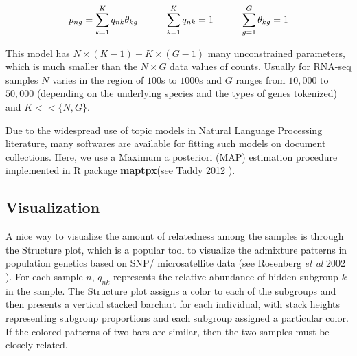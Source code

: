 $$ p_{ng} = \sum_{k=1}^{K} q_{nk}\theta_{kg}   \hspace{1 cm}  \sum_{k=1}^{K} q_{nk}=1 \hspace{1 cm} \sum_{g=1}^{G} \theta_{kg}=1 $$

This model has $N \times (K-1) + K \times (G-1)$ many unconstrained parameters, which is much smaller than the $N \times G$  data values of counts. Usually for RNA-seq samples $N$ varies in the region of $100$s to $1000$s  and $G$ ranges from $10,000$ to $50,000$ (depending on the underlying species and the types of genes tokenized) and $K << \{N,G \}$. 

Due to the widespread use of topic models in Natural Language Processing literature, many softwares are available for fitting such models on document collections. Here, we use a Maximum a posteriori (MAP)  estimation procedure implemented in R package  \textbf{maptpx}(see Taddy 2012 \cite{Taddy2012}).

%
%

\subsection{Visualization}

A nice way to visualize the amount of relatedness among the samples is through the Structure plot, which is a popular tool to visualize the admixture patterns in population genetics based on SNP/ microsatellite data (see Rosenberg \textit{et al} 2002 \cite{Rosenberg2002}).  
For each sample $n$, $q_{nk}$  represents the relative abundance of  hidden subgroup $k$ in the sample. The Structure plot  assigns a color to each of the subgroups and then presents a vertical stacked barchart for each individual, with stack heights representing subgroup proportions and each subgroup assigned a particular color. If the colored patterns of two bars are similar, then the two samples must be closely related.  

